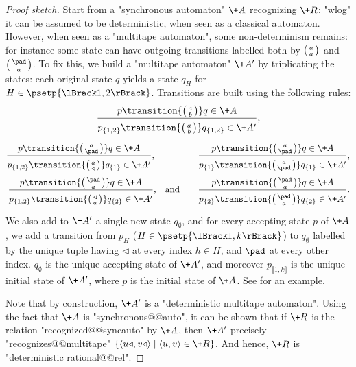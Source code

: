 \begin{proof}[Proof sketch]
	Start from a "synchronous automaton" $\+A$ recognizing $\+R$:
	"wlog" it can be assumed to be deterministic, when seen 
	as a classical automaton. However, when seen as a "multitape automaton", some non-determinism 
	remains: for instance some state can have outgoing transitions labelled both
	by $\pair{a}{a}$ and $\pair{\pad}{a}$.
	To fix this, we build a "multitape automaton" $\+A'$ by triplicating the states:
	each original state $q$ yields a state $q_H$ for $H \in \psetp{\lBrack 1,2 \rBrack}$.
	Transitions are built using the following rules:
	\[
		\frac{
			p \transition{\pair{a}{b}} q \in \+A
		}{
			p_{\{1,2\}} \transition{\pair{a}{b}} q_{\{1,2\}} \in \+A'
			\vphantom{\Big()}
		},
	\]
	\vspace{-2em}
	\begin{align*}
		\frac{
			p \transition{\pair{a}{\pad}} q \in \+A
		}{
			p_{\{1,2\}} \transition{\pair{a}{\triangleleft}} q_{\{1\}} \in \+A'
			\vphantom{\Big()}
		},\hphantom{\quad and}\qquad
		& 
		\frac{
			p \transition{\pair{a}{\pad}} q \in \+A	
		}{
			p_{\{1\}} \transition{\pair{a}{\pad}} q_{\{1\}} \in \+A'
			\vphantom{\Big()}
		}, \\
		\frac{
			p \transition{\pair{\pad}{a}} q \in \+A
		}{
			p_{\{1,2\}} \transition{\pair{\triangleleft}{a}} q_{\{2\}} \in \+A'
			\vphantom{\Big()}
		}\text{,\quad and}\qquad
		& 
		\frac{
			p \transition{\pair{\pad}{a}} q \in \+A
		}{
			p_{\{2\}} \transition{\pair{\pad}{a}} q_{\{2\}} \in \+A'
			\vphantom{\Big()}
		}.\\
	\end{align*}
	We also add to $\+A'$ a single new state $q_{\emptyset}$, and for every accepting state $p$ of
	$\+A$, we add a transition from $p_H$ ($H \in \psetp{\lBrack 1,k\rBrack}$) to $q_{\emptyset}$
	labelled by the unique tuple having $\triangleleft$ at every index $h \in H$,
	and $\pad$ at every other index.
	$q_{\emptyset}$ is the unique accepting state of $\+A'$, and moreover
	$p_{\lBrack 1,k\rBrack}$ is the unique initial state of $\+A'$, where $p$ is the initial state of $\+A$. See  for an example.
	
	Note that by construction, $\+A'$ is a "deterministic multitape automaton". 
	Using the fact that $\+A$ is "synchronous@@auto", it can be shown that
	if $\+R$ is the relation "recognized@@syncauto" by $\+A$, then $\+A'$ precisely 
	"recognizes@@multitape" $\{\tup{u\triangleleft,v\triangleleft} \mid \tup{u,v} \in \+R\}$.
	And hence, $\+R$ is "deterministic rational@@rel".
\end{proof}

